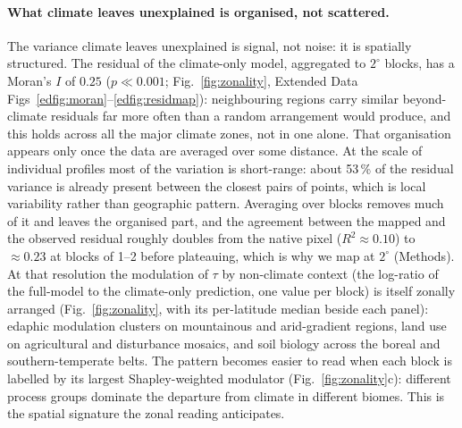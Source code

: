 \documentclass[12pt, a4paper]{article}
\begin{document}
\paragraph{What climate leaves unexplained is organised, not scattered.}
The variance climate leaves unexplained is signal, not noise: it is spatially
structured. The residual of the
climate-only model, aggregated to $2^{\circ}$ blocks, has a Moran's $I$ of $0.25$
($p\ll0.001$; Fig.~\ref{fig:zonality}, Extended Data
Figs~\ref{edfig:moran}--\ref{edfig:residmap}): neighbouring regions carry similar
beyond-climate residuals far more often than a random arrangement would produce, and
this holds across all the major climate zones, not in one alone. That organisation
appears only once the data are averaged over some distance. At the scale of
individual profiles most of the variation is short-range: about 53\,\% of the
residual variance is already present between the closest pairs of points, which is
local variability rather than geographic pattern. Averaging over blocks removes much
of it and leaves the organised part, and the agreement between the mapped and the
observed residual roughly doubles from the native pixel ($R^2\approx0.10$) to
$\approx0.23$ at blocks of 1--2\textdegree{} before plateauing, which is why we map
at $2^{\circ}$ (Methods). At that resolution the modulation of $\tau$ by non-climate
context (the log-ratio of the full-model to the climate-only prediction, one value
per block) is itself zonally arranged (Fig.~\ref{fig:zonality},
with its per-latitude median beside each panel):
edaphic modulation clusters on mountainous and arid-gradient regions, land use on
agricultural and disturbance mosaics, and soil biology across the boreal and
southern-temperate belts. The pattern becomes easier to read when each block is labelled by its largest
Shapley-weighted modulator (Fig.~\ref{fig:zonality}c): different process groups
dominate the departure from climate in different biomes.
This is the spatial signature the zonal reading anticipates.
\end{document}
